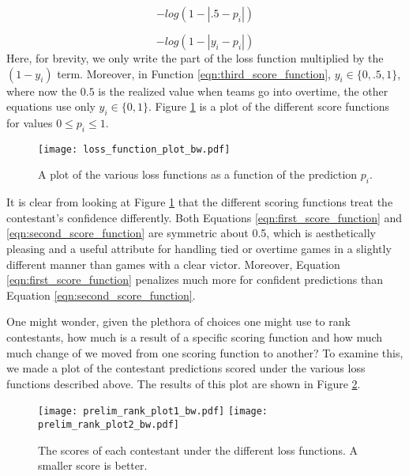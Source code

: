 \begin{equation}\label{eqn:second_score_function}
-log(1-|.5-p_i|)
\end{equation} 

\begin{equation}\label{eqn:third_score_function}
-log(1-|y_i-p_i|)
\end{equation} 
Here, for brevity, we only write the part of the loss function multiplied by the $(1-y_i)$ term. Moreover, in Function \ref{eqn:third_score_function}, $y_i \in \{0,.5,1\}$, where now the $0.5$ is the realized value when teams go into overtime, the other equations use only $y_i \in \{0,1\}$. Figure \ref{fig:scoring_functions} is a plot of the different score functions for values $0\leq p_i \leq 1$.  


\begin{figure}[H]
\centering
\texttt{[image: loss\_function\_plot\_bw.pdf]}
\caption{A plot of the various loss functions as a function of the prediction $p_i$.  }
\label{fig:scoring_functions}
\end{figure}

It is clear from looking at Figure \ref{fig:scoring_functions} that the different scoring functions treat the contestant's confidence differently. Both Equations \ref{eqn:first_score_function} and \ref{eqn:second_score_function} are symmetric about 0.5, which is aesthetically pleasing and a useful attribute for handling tied or overtime games in a slightly different manner than games with a clear victor. Moreover, Equation \ref{eqn:first_score_function} penalizes much more for confident predictions than Equation \ref{eqn:second_score_function}. 

One might wonder, given the plethora of choices one might use to rank contestants, how much is a result of a specific scoring function and how much much change of  we moved from one scoring function to another? To examine this, we made a plot of the contestant predictions scored under the various loss functions described above. The results of this plot are shown in Figure \ref{fig:score_rank_plot}. 

  \begin{figure}[h]
\centering
\texttt{[image: prelim\_rank\_plot1\_bw.pdf]}
\texttt{[image: prelim\_rank\_plot2\_bw.pdf]}

\caption{The scores of each contestant under the different loss functions. A smaller score is better.  }
\label{fig:score_rank_plot}
\end{figure}

